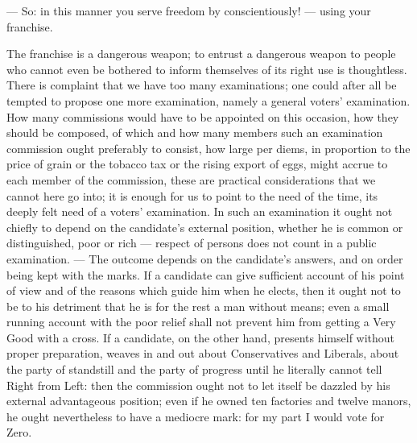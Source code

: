 \documentclass[12pt,a4paper,openany]{book}
\newcommand{\opage}[1]{\marginnote{\footnotesize\textit{[#1]}}}
\begin{document}
--- So: in this manner you serve freedom by
conscientiously! --- using your franchise.

The franchise is a dangerous weapon; to entrust a dangerous
weapon to people who cannot even be bothered to inform
themselves of its right use is thoughtless. There is complaint
that we have too many examinations; one could after all
\setcounter{footnote}{0}%
\opage{66}be tempted to propose one more examination, namely a
general voters' examination. How many commissions
would have to be appointed on this occasion, how
they should be composed, of which and how many
members such an examination commission ought preferably to
consist, how large per diems, in proportion to the price of grain
or the tobacco tax or the rising export
of eggs, might accrue to each member of the commission,
these are practical considerations that we cannot here go into;
it is enough for us to point to the need of the time, its
deeply felt need of a voters' examination. In such an
examination it ought not chiefly to depend on
the candidate's external position, whether he is common or
distinguished, poor or rich --- respect of persons does not count
in a public examination. --- The outcome depends on
the candidate's answers, and on order being kept with the marks.
If a candidate can give sufficient account of
his point of view and of the reasons which guide him when he
elects, then it ought not to be to his detriment that he
is for the rest a man without means; even a small
running account with the poor relief shall not prevent
him from getting a Very Good with a cross. If a candidate,
on the other hand, presents himself without proper preparation, weaves
in and out about Conservatives and Liberals, about the party of standstill
and the party of progress until he
literally cannot tell Right from Left: then the
commission ought not to let itself be dazzled by his external advantageous
position; even if he owned ten factories and
twelve manors, he ought nevertheless to have a mediocre
mark: for my part I would vote for Zero.
\end{document}
